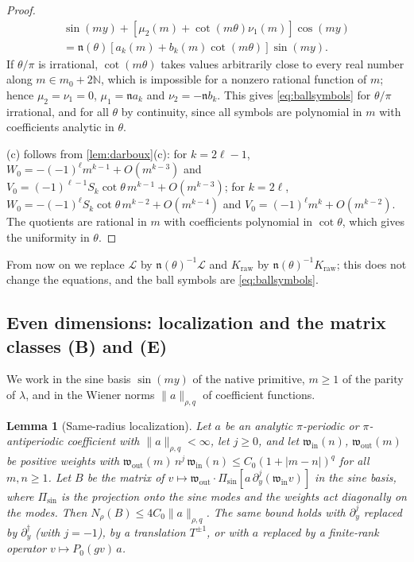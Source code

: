 \documentclass[11pt]{amsart}
\numberwithin{equation}{section}
\newtheorem{lemma}[theorem]{Lemma}
\theoremstyle{definition}
\theoremstyle{remark}
\newcommand{\N}{\mathbb{N}}
\newcommand{\abs}[1]{\lvert #1\rvert}
\newcommand{\norm}[1]{\lVert #1\rVert}
\begin{document}
\begin{proof}
\begin{multline*}
[\mu_1(m)-\cot(m\theta)\nu_2(m)]\sin(my)+[\mu_2(m)+\cot(m\theta)\nu_1(m)]\cos(my)\\
=\mathfrak n(\theta)[a_k(m)+b_k(m)\cot(m\theta)]\sin(my).
\end{multline*}
If $\theta/\pi$ is irrational, $\cot(m\theta)$ takes values arbitrarily close to every real number along $m\in m_0+2\N$, which is impossible for a nonzero rational function of $m$; hence $\mu_2=\nu_1=0$, $\mu_1=\mathfrak n a_k$ and $\nu_2=-\mathfrak nb_k$. This gives \eqref{eq:ballsymbols} for $\theta/\pi$ irrational, and for all $\theta$ by continuity, since all symbols are polynomial in $m$ with coefficients analytic in $\theta$.

(c) follows from \cref{lem:darboux}(c): for $k=2\ell-1$, $W_0=-(-1)^\ell m^{k-1}+O(m^{k-3})$ and $V_0=(-1)^{\ell-1}S_k\cot\theta\,m^{k-1}+O(m^{k-3})$; for $k=2\ell$, $W_0=-(-1)^\ell S_k\cot\theta\,m^{k-2}+O(m^{k-4})$ and $V_0=(-1)^\ell m^k+O(m^{k-2})$. The quotients are rational in $m$ with coefficients polynomial in $\cot\theta$, which gives the uniformity in $\theta$.
\end{proof}

From now on we replace $\mathcal L$ by $\mathfrak n(\theta)^{-1}\mathcal L$ and $K_{\mathrm{raw}}$ by $\mathfrak n(\theta)^{-1}K_{\mathrm{raw}}$; this does not change the equations, and the ball symbols are \eqref{eq:ballsymbols}.

\subsection{Even dimensions: localization and the matrix classes (B) and (E)}
We work in the sine basis $\sin(my)$ of the native primitive, $m\ge1$ of the parity of $\lambda$, and in the Wiener norms $\norm a_{\rho,q}$ of coefficient functions.

\begin{lemma}[Same-radius localization]\label{lem:local}
Let $a$ be an analytic $\pi$-periodic or $\pi$-antiperiodic coefficient with $\norm a_{\rho,q}<\infty$, let $j\ge0$, and let $\mathfrak w_{\mathrm{in}}(n)$, $\mathfrak w_{\mathrm{out}}(m)$ be positive weights with $\mathfrak w_{\mathrm{out}}(m)\,n^j\,\mathfrak w_{\mathrm{in}}(n)\le C_0(1+\abs{m-n})^q$ for all $m,n\ge1$. Let $B$ be the matrix of $v\mapsto\mathfrak w_{\mathrm{out}}\cdot\Pi_{\sin}[a\,\partial_y^j(\mathfrak w_{\mathrm{in}}v)]$ in the sine basis, where $\Pi_{\sin}$ is the projection onto the sine modes and the weights act diagonally on the modes. Then $N_\rho(B)\le4C_0\norm a_{\rho,q}$. The same bound holds with $\partial_y^j$ replaced by $\partial_y^{\dagger}$ (with $j=-1$), by a translation $T^{\pm1}$, or with $a$ replaced by a finite-rank operator $v\mapsto P_0(gv)\,a$.
\end{lemma}
\end{document}
